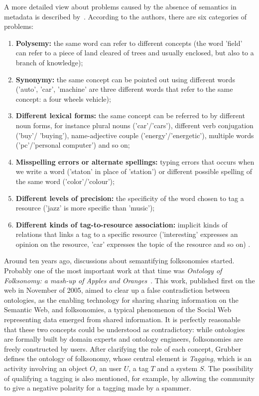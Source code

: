 A more detailed view about problems caused by the absence of semantics in metadata is described by~.
According to the authors, there are six categories of problems:

\begin{citacao}
\begin{enumerate}
\item \textbf{Polysemy:} the same word can refer to different concepts (the word ’field’ can refer to a piece of land cleared of trees and usually enclosed, but also to a branch of knowledge);
\item \textbf{Synonymy:} the same concept can be pointed out using different words (’auto’, ’car’, ’machine’ are three different words that refer to the same concept: a four wheels vehicle);
\item \textbf{Different lexical forms:} the same concept can be referred to by different noun forms, for instance plural nouns (’car’/’cars’), different verb conjugation (’buy’/ ’buying’), name-adjective couple (’energy’/’energetic’), multiple words (’pc’/’personal computer’) and so on;
\item \textbf{Misspelling errors or alternate spellings:} typing errors that occurs when we write a word (’staton’ in place of ’station’) or different possible spelling of the same word (’color’/’colour’);
\item \textbf{Different levels of precision:} the specificity of the word chosen to tag a resource (’jazz’ is more specific than ’music’);
\item \textbf{Different kinds of tag-to-resource association:} implicit kinds of relations that links a tag to a specific resource (’interesting’ expresses an opinion on the resource, ’car’ expresses the topic of the resource and so on) \cite[p.2]{Marchetti2007}.
\end{enumerate}
\end{citacao}

Around ten years ago, discussions about semantifying folksonomies started.
Probably one of the most important work at that time was \emph{Ontology of Folksonomy: a mash-up of Apples and Oranges}~\cite{Grubber2007}.
This work, published first on the web in November of 2005, aimed to clear up a false contradiction between ontologies, as the enabling technology for sharing sharing information on the Semantic Web, and folksonomies, a typical phenomenon of the Social Web representing data emerged from shared information.
It is perfectly reasonable that these two concepts could be understood as contradictory: while ontologies are formally built by domain experts and ontology engineers, folksonomies are freely constructed by users.
After clarifying the role of each concept, Grubber defines the ontology of folksonomy, whose central element is \emph{Tagging}, which is an activity involving an object $O$, an user $U$, a tag $T$ and a system $S$.
The possibility of qualifying a tagging is also mentioned, for example, by allowing the community to give a negative polarity for a tagging made by a spammer.

